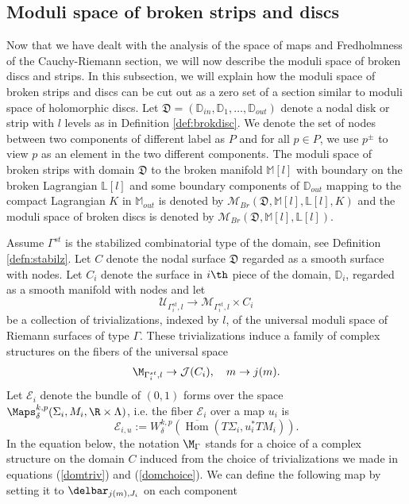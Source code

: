 \subsection{Moduli space of broken strips and discs}
Now that we have dealt with the analysis of the space of maps and Fredholmness of the Cauchy-Riemann section, we will now describe the moduli space of broken discs and strips.  In this subsection, we will explain how the moduli space of broken strips and discs can be cut out as a zero set of a section similar to moduli space of holomorphic discs. Let $\mathfrak{D}=(\mathbb{D}_{in},\mathbb{D}_1,\dots , \mathbb{D}_{out})$ denote a nodal disk or strip with $l$ levels as in Definition \ref{def:brokdisc}. We denote the set of nodes between two components of different label as $P$ and for all $p\in P $, we use $p^\pm$ to view $p$ as an element in the two different components. The moduli space of broken strips with domain $\mathfrak{D}$ to the broken manifold $\mathbb{M}[l]$ with boundary on the broken Lagrangian $\mathbb{L}[l]$ and some boundary components of $\mathbb{D}_{out}$ mapping to the compact Lagrangian $K$ in $\mathbb{M}_{out}$ is denoted by $\mathcal{M}_{Br}(\mathfrak{D},\mathbb{M}[l],\mathbb{L}[l],K)$ and the moduli space of broken discs is denoted by $\mathcal{M}_{Br}(\mathfrak{D},\mathbb{M}[l],\mathbb{L}[l])$.

Assume $\Gamma^{st}$ is the stabilized combinatorial type of the domain, see Definition \ref{defn:stabilz}. Let $C$ denote the nodal surface $\mathfrak{D}$ regarded as a smooth surface with nodes. Let $C_i$ denote the surface in $i\th$ piece of the domain, $\mathbb D_i$, regarded as a smooth manifold with nodes and let 
\begin{equation}\label{domtriv}
    \mathcal{U}_{\Gamma^{st}_i,l} \to \mathcal{M}_{\Gamma^{st}_i,l} \times C_i
\end{equation}
be a collection of trivializations, indexed by $l$, of the universal moduli space of Riemann surfaces of type $\Gamma$. These trivializations induce a family of complex structures on the fibers of the universal space \begin{equation}\label{domchoice}
    \M_{\Gamma^{st}_i,l} \to \mathcal{J}(C_i), \quad m\to j(m).
\end{equation}
\noindent Let $\mathcal{E}_i$ denote the bundle of $(0,1)$ forms over the space $\Maps^{k,p}_{\delta}(\Sigma_i,M_i ,\R \times \Lambda)$, i.e. the fiber $\mathcal{E}_i$ over a map $u_i$ is 
\begin{equation*}
    \mathcal{E}_{i,u}:= W^{k,p}_\delta ( \overline{\operatorname{Hom}}( T\Sigma_i,u_i^*TM_i)).
\end{equation*}
In the equation below, the notation $\M_\Gamma$ stands for a choice of a complex structure on the domain $C$ induced from the choice of trivializations we made in equations (\ref{domtriv}) and (\ref{domchoice}).  We can define the following map by setting it to $\delbar_{j(m),J_i}$ on each component 

